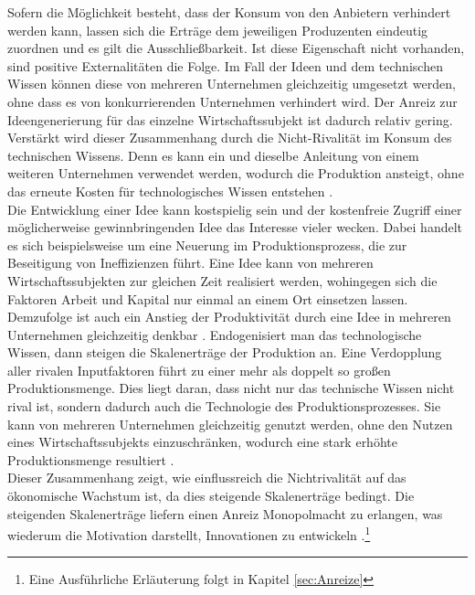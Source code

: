 Sofern die Möglichkeit besteht, dass der Konsum von den Anbietern verhindert werden kann, lassen sich die Ertr{\"a}ge dem jeweiligen Produzenten eindeutig zuordnen und es gilt die Ausschlie{\ss}barkeit. Ist diese Eigenschaft nicht vorhanden, sind positive Externalit{\"a}ten die Folge. Im Fall der Ideen und dem technischen Wissen k{\"o}nnen diese von mehreren Unternehmen gleichzeitig umgesetzt werden, ohne dass es von konkurrierenden Unternehmen verhindert wird. Der Anreiz zur Ideengenerierung f{\"u}r das einzelne Wirtschaftssubjekt ist dadurch relativ gering. Verstärkt wird dieser Zusammenhang durch die Nicht-Rivalität im Konsum des technischen Wissens. Denn es kann ein und dieselbe Anleitung von einem weiteren Unternehmen verwendet werden, wodurch die Produktion ansteigt, ohne das erneute Kosten f{\"u}r technologisches Wissen entstehen \citep{.1968,Ostrom.1990}.\\


Die Entwicklung einer Idee kann kostspielig sein und der kostenfreie Zugriff einer m{\"o}glicherweise gewinnbringenden Idee das Interesse vieler wecken. Dabei handelt es sich beispielsweise um eine Neuerung im Produktionsprozess, die zur Beseitigung von Ineffizienzen f{\"u}hrt. Eine Idee kann von mehreren Wirtschaftssubjekten zur gleichen Zeit realisiert werden, wohingegen sich die Faktoren Arbeit und Kapital nur einmal an einem Ort einsetzen lassen. Demzufolge ist auch ein Anstieg der Produktivit{\"a}t durch eine Idee in mehreren Unternehmen gleichzeitig denkbar \citep{Romer.1986}. \newline 
Endogenisiert man das technologische Wissen, dann steigen die Skalenertr{\"a}ge der Produktion an. Eine Verdopplung aller rivalen Inputfaktoren f{\"u}hrt zu einer mehr als doppelt so gro{\ss}en Produktionsmenge. Dies liegt daran, dass nicht nur das technische Wissen nicht rival ist, sondern dadurch auch die Technologie des Produktionsprozesses. Sie kann von mehreren Unternehmen gleichzeitig genutzt werden, ohne den Nutzen eines Wirtschaftssubjekts einzuschr{\"a}nken, wodurch eine stark erh{\"o}hte Produktionsmenge resultiert \citep{Jones.2005}.\\


Dieser Zusammenhang zeigt, wie einflussreich die Nichtrivalit{\"a}t auf das {\"o}konomische Wachstum ist, da dies steigende Skalenertr{\"a}ge bedingt. Die steigenden Skalenertr{\"a}ge liefern einen Anreiz Monopolmacht zu erlangen, was wiederum die Motivation darstellt, Innovationen zu entwickeln \citep{Jones.2005,Romer.1993}.\footnote{Eine Ausführliche Erläuterung folgt in Kapitel \ref{sec:Anreize}}\\


